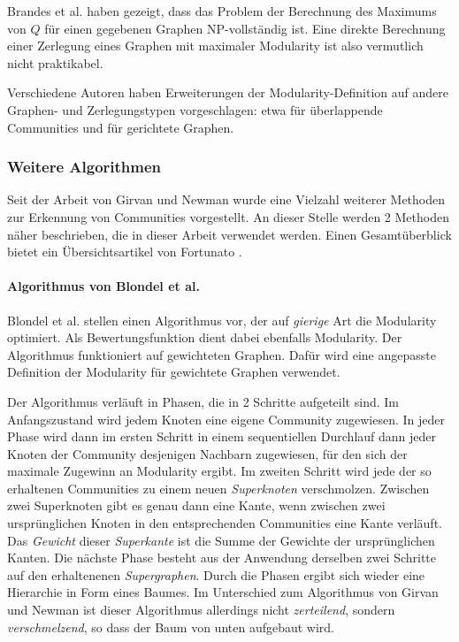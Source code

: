 Brandes et al. haben gezeigt, dass das Problem der Berechnung des
Maximums von $Q$ für einen gegebenen Graphen NP-vollständig
ist\cite{DBLP:journals/tkde/BrandesDGGHNW08}. Eine direkte Berechnung
einer Zerlegung eines Graphen mit maximaler Modularity ist also
vermutlich nicht praktikabel.

Verschiedene Autoren haben Erweiterungen der Modularity-Definition auf
andere Graphen- und Zerlegungstypen vorgeschlagen: etwa für
überlappende Communities\cite{Nicosia2009} und für gerichtete
Graphen\cite{Leicht2008}.

\subsubsection{Weitere Algorithmen}
\label{sec:algorithmen}

Seit der Arbeit von Girvan und Newman wurde eine Vielzahl weiterer
Methoden zur Erkennung von Communities vorgestellt. An dieser Stelle
werden 2 Methoden näher beschrieben, die in dieser Arbeit verwendet
werden. Einen Gesamtüberblick bietet ein Übersichtsartikel von
Fortunato \cite{Fortunato2010}.

\paragraph{Algorithmus von Blondel et al.}
\label{sec:algor-von-blond}

Blondel et al.\cite{Blondel2008} stellen einen Algorithmus vor, der
auf \emph{gierige} Art die Modularity optimiert.  Als
Bewertungsfunktion dient dabei ebenfalls Modularity. Der Algorithmus
funktioniert auf gewichteten Graphen. Dafür wird eine angepasste
Definition der Modularity für gewichtete Graphen
verwendet\cite{Newman2004a}.

Der Algorithmus verläuft in Phasen, die in 2 Schritte aufgeteilt
sind. Im Anfangszustand wird jedem Knoten eine eigene Community
zugewiesen. In jeder Phase wird dann im ersten Schritt in einem
sequentiellen Durchlauf dann jeder Knoten der Community desjenigen
Nachbarn zugewiesen, für den sich der maximale Zugewinn an
Modularity ergibt. Im zweiten Schritt wird jede der so erhaltenen
Communities zu einem neuen \emph{Superknoten} verschmolzen. Zwischen
zwei Superknoten gibt es genau dann eine Kante, wenn zwischen zwei
ursprünglichen Knoten in den entsprechenden Communities eine Kante
verläuft. Das \emph{Gewicht} dieser \emph{Superkante} ist die Summe
der Gewichte der ursprünglichen Kanten. Die nächste Phase besteht
aus der Anwendung derselben zwei Schritte auf den erhaltenenen
\emph{Supergraphen}. Durch die Phasen ergibt sich wieder eine
Hierarchie in Form eines Baumes. Im Unterschied zum Algorithmus von
Girvan und Newman ist dieser Algorithmus allerdings nicht
\emph{zerteilend}, sondern \emph{verschmelzend}, so dass der Baum von
unten aufgebaut wird.

